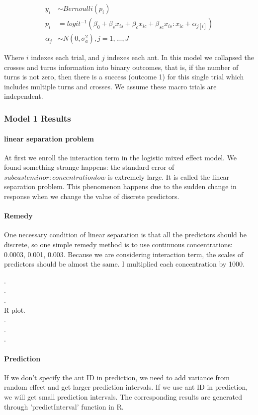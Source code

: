 \documentclass{article}
\begin{document}
	\begin{align*}
	y_i &\sim Bernoulli(p_i)\\
	p_i &= logit^{-1}(\beta_0 + \beta_sx_{is} + \beta_cx_{ic} + \beta_{sc}x_{is}:x_{ic} + \alpha_{j[i]})\\
	\alpha_j &\sim N(0, \sigma^2_a),j=1,...,J
	\end{align*}  
	
	Where $i$ indexes each trial, and $j$ indexes each ant. In this model we collapsed the crosses and turns information into binary outcomes, that is, if the number of turns is not zero, then there is a success (outcome 1) for this single trial which includes multiple turns and crosses. We assume these macro trials are independent.

	\subsubsection{Model 1 Results}
	\paragraph{linear separation problem}
	At first we enroll the interaction term in the logistic mixed effect model. We found something strange happens: the standard error of $subcasteminor:concentrationlow$ is extremely large. It is called the linear separation problem. This phenomenon happens due to the sudden change in response when we change the value of discrete predictors. 
	
	\paragraph{Remedy}One necessary condition of linear separation is that all the predictors should be discrete, so one simple remedy method is to use continuous concentrations: 0.0003, 0.001, 0.003. Because we are considering interaction term, the scales of predictors should be almost the same. I multiplied each concentration by 1000.
		
		
		.\\
		.\\
		.\\
		R plot.\\
		.\\
		.\\
		.
	\paragraph{Prediction}
	If we don’t specify the ant ID in prediction, we need to add variance from random effect and get larger prediction intervals. If we use ant ID in prediction, we will get small prediction intervals. The corresponding results are generated through 'predictInterval' function in R.
\end{document}
